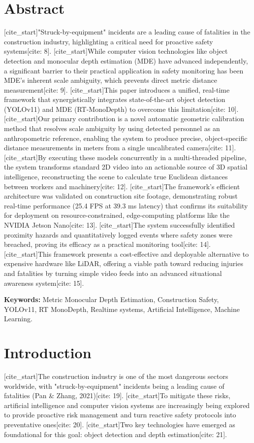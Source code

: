 \section*{Abstract}
[cite_start]"Struck-by-equipment" incidents are a leading cause of fatalities in the construction industry, highlighting a critical need for proactive safety systems[cite: 8]. [cite_start]While computer vision technologies like object detection and monocular depth estimation (MDE) have advanced independently, a significant barrier to their practical application in safety monitoring has been MDE's inherent scale ambiguity, which prevents direct metric distance measurement[cite: 9]. [cite_start]This paper introduces a unified, real-time framework that synergistically integrates state-of-the-art object detection (YOLOv11) and MDE (RT-MonoDepth) to overcome this limitation[cite: 10]. [cite_start]Our primary contribution is a novel automatic geometric calibration method that resolves scale ambiguity by using detected personnel as an anthropometric reference, enabling the system to produce precise, object-specific distance measurements in meters from a single uncalibrated camera[cite: 11]. [cite_start]By executing these models concurrently in a multi-threaded pipeline, the system transforms standard 2D video into an actionable source of 3D spatial intelligence, reconstructing the scene to calculate true Euclidean distances between workers and machinery[cite: 12]. [cite_start]The framework's efficient architecture was validated on construction site footage, demonstrating robust real-time performance (25.4 FPS at 39.3 ms latency) that confirms its suitability for deployment on resource-constrained, edge-computing platforms like the NVIDIA Jetson Nano[cite: 13]. [cite_start]The system successfully identified proximity hazards and quantitatively logged events where safety zones were breached, proving its efficacy as a practical monitoring tool[cite: 14]. [cite_start]This framework presents a cost-effective and deployable alternative to expensive hardware like LiDAR, offering a viable path toward reducing injuries and fatalities by turning simple video feeds into an advanced situational awareness system[cite: 15].

\vspace{0.3cm}
\noindent \textbf{Keywords:} Metric Monocular Depth Estimation, Construction Safety, YOLOv11, RT MonoDepth, Realtime systems, Artificial Intelligence, Machine Learning.

\section{Introduction}
[cite_start]The construction industry is one of the most dangerous sectors worldwide, with "struck-by-equipment" incidents being a leading cause of fatalities (Pan \& Zhang, 2021)[cite: 19]. [cite_start]To mitigate these risks, artificial intelligence and computer vision systems are increasingly being explored to provide proactive risk management and turn reactive safety protocols into preventative ones[cite: 20]. [cite_start]Two key technologies have emerged as foundational for this goal: object detection and depth estimation[cite: 21].

